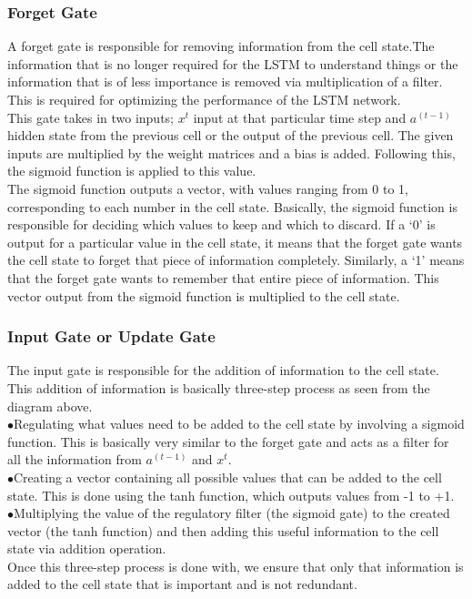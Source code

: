   \subsubsection{Forget Gate}
  A forget gate is responsible for removing information from the cell state.The information that is no longer required for the LSTM to understand things or the information that is of less importance is removed via multiplication of a filter. This is required for optimizing the performance of the LSTM network.\\
  This gate takes in two inputs; $x^t$ input at that particular time step and $a^{(t-1)}$ hidden state from the previous cell or the output of the previous cell. The given inputs are multiplied by the weight matrices and a bias is added. Following this, the sigmoid function is applied to this value.\\
  The sigmoid function outputs a vector, with values ranging from 0 to 1, corresponding to each number in the cell state. Basically, the sigmoid function is responsible for deciding which values to keep and which to discard. If a ‘0’ is output for a particular value in the cell state, it means that the forget gate wants the cell state to forget that piece of information completely. Similarly, a ‘1’ means that the forget gate wants to remember that entire piece of information. This vector output from the sigmoid function is multiplied to the cell state.
  \subsubsection{Input Gate or Update Gate}The input gate is responsible for the addition of information to the cell state. This addition of information is basically three-step process as seen from the diagram above.\\
  \indent$\bullet$\hspace{5pt}Regulating what values need to be added to the cell state by involving a sigmoid function. This is basically very similar to the forget gate and acts as a filter for all the information from $a^{(t-1)}$ and $x^t$.\\
  \indent$\bullet$\hspace{5pt}Creating a vector containing all possible values that can be added to the cell state. This is done using the tanh function, which outputs values from -1 to +1.\\
  \indent$\bullet$\hspace{5pt}Multiplying the value of the regulatory filter (the sigmoid gate) to the created vector (the tanh function) and then adding this useful information to the cell state via addition operation.\\
  Once this three-step process is done with, we ensure that only that information is added to the cell state that is important and is not redundant.
